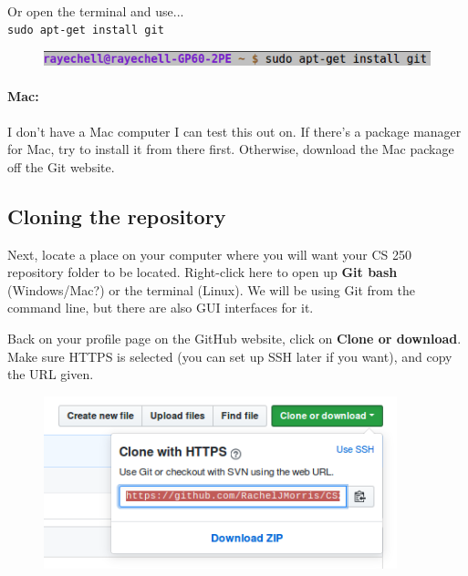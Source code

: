 \documentclass[a4paper,12pt,oneside]{book}
\begin{document}
            ~\\
            Or open the terminal and use... \\
            \texttt{sudo apt-get install git}

                \begin{figure}[h]
                    \centering
                    \includegraphics[width=14cm]{images/git-commandline-install.png}
                \end{figure}
            
        \paragraph{Mac:}

            I don't have a Mac computer I can test this out on. If there's
            a package manager for Mac, try to install it from there first.
            Otherwise, download the Mac package off the Git website.

        \subsection{Cloning the repository}

            Next, locate a place on your computer where you will want
            your CS 250 repository folder to be located.
            Right-click here to open up \textbf{Git bash} (Windows/Mac?)
            or the terminal (Linux). We will be using Git from the command
            line, but there are also GUI interfaces for it.

            Back on your profile page on the GitHub website, click on
            \textbf{Clone or download}. Make sure HTTPS is selected (you
            can set up SSH later if you want), and copy the URL given.

                \begin{figure}[h]
                    \centering
                    \includegraphics[height=5cm]{images/git-cloneurl.png}
                \end{figure}
\end{document}
